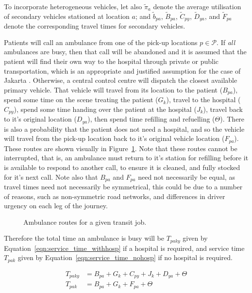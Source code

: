 \documentclass[numbers,webpdf,imaman]{ima-authoring-template}%
\begin{document}
To incorporate heterogeneous vehicles, let also $\tilde{\pi}_a$ denote the
average utilisation of secondary vehicles stationed at location $a$; and
$\tilde{b}_{pa}$, $\tilde{B}_{pa}$, $\tilde{C}_{py}$, $\tilde{D}_{ya}$, and
$\tilde{F}_{pa}$ denote the corresponding travel times for secondary vehicles.

Patients will call an ambulance from one of the pick-up locations
$p \in \mathcal{P}$. If \textit{all} ambulances are busy, then that call will be
abandoned and it is assumed that the patient will find their own way to the
hospital through private or public transportation, which is an appropriate and
justified assumption for the case of Jakarta \citep{BriceSyaribahNoor2022Esui}.
Otherwise, a central control centre will dispatch the closest available primary
vehicle. That vehicle will travel from its location to the patient ($B_{pa}$),
spend some time on the scene treating the patient ($G_k$), travel to the
hospital ($C_{py}$), spend some time handing over the patient at the hospital
($J_k$), travel back to it's original location ($D_{ya}$), then spend time
refilling and refuelling ($\Theta$).
There is also a probability that the patient does not need a hospital, and so
the vehicle will travel from the pick-up location back to it's original vehicle
location ($F_{pa}$). These routes are shown visually in
Figure~\ref{fig:travel_routes}. Note that these routes cannot be interrupted,
that is, an ambulance must return to it's station for refilling before it is
available to respond to another call, to ensure it is cleaned, and fully stocked
for it's next call. Note also that $B_{pa}$ and $F_{pa}$ need not necessarily be
equal, as travel times need not necessarily be symmetrical, this could be due to
a number of reasons, such as non-symmetric road networks, and differences in
driver urgency on each leg of the journey.

\begin{figure}
    \centering
    
    \caption{Ambulance routes for a given transit job.}
    \label{fig:travel_routes}
\end{figure}

Therefore the total time an ambulance is busy will be $T_{paky}$ given by
Equation~\ref{eqn:service_time_withhosp} if a hospital is required, and
service time $T_{pak}$ given by Equation~\ref{eqn:service_time_nohosp} if no
hospital is required.

\begin{align}
T_{paky} &= B_{pa} + G_k + C_{py} + J_k + D_{ya} + \Theta \label{eqn:service_time_withhosp} \\
T_{pak} &= B_{pa} + G_k + F_{pa} + \Theta \label{eqn:service_time_nohosp}
\end{align}
\end{document}
